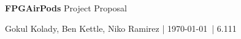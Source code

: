 \documentclass[12pt]{article}
\begin{document}
{\Huge \sffamily \textbf{FPGAirPods} Project Proposal}

\vspace{2mm}
{\sffamily Gokul Kolady, Ben Kettle, Niko Ramirez | \today \ | 6.111}
\vspace{5mm}

\begin{multicols}{2}
	\lipsum
\end{multicols}

\printbibliography
\end{document}
